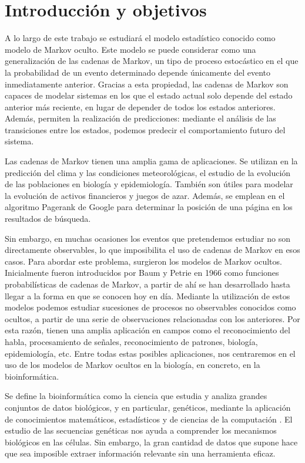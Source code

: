 \chapter*{Introducción y objetivos}


A lo largo de este trabajo se estudiará el modelo estadístico conocido como modelo de Markov oculto. Este modelo se puede considerar como una generalización de las cadenas de Markov, un tipo de proceso estocástico en el que la probabilidad de un evento determinado depende únicamente del evento inmediatamente anterior. Gracias a esta propiedad, las cadenas de Markov son capaces de modelar sistemas en los que el estado actual solo depende del estado anterior más reciente, en lugar de depender de todos los estados anteriores. Además, permiten la realización de predicciones: mediante el análisis de las transiciones entre los estados, podemos predecir el comportamiento futuro del sistema. 

Las cadenas de Markov tienen una amplia gama de aplicaciones. Se utilizan en la predicción del clima y las condiciones meteorológicas, el estudio de la evolución de las poblaciones en biología y epidemiología. También son útiles para modelar la evolución de activos financieros y juegos de azar. Además, se emplean en el algoritmo Pagerank de Google para determinar la posición de una página en los resultados de búsqueda.

Sin embargo, en muchas ocasiones los eventos que pretendemos estudiar no son directamente observables, lo que imposibilita el uso de cadenas de Markov en esos casos. Para abordar este problema, surgieron los modelos de Markov ocultos. Inicialmente fueron introducidos por Baum y Petrie en 1966 \cite{Baum} como funciones probabilísticas de cadenas de Markov, a partir de ahí se han desarrollado hasta llegar a la forma en que se conocen hoy en día. Mediante la utilización de estos modelos podemos estudiar sucesiones de procesos no observables conocidos como ocultos, a partir de una serie de observaciones relacionadas con los anteriores. Por esta razón, tienen una amplia aplicación en campos como el reconocimiento del habla, procesamiento de señales, reconocimiento de patrones, biología, epidemiología, etc. Entre todas estas posibles aplicaciones, nos centraremos en el uso de los modelos de Markov ocultos en la biología, en concreto, en la bioinformática. 

Se define la bioinformática como la ciencia que estudia y analiza grandes conjuntos de datos biológicos, y en particular, genéticos, mediante la aplicación de conocimientos matemáticos, estadísticos y de ciencias de la computación \cite{Warren}. El estudio de las secuencias genéticas nos ayuda a comprender los mecanismos biológicos en las células. Sin embargo, la gran cantidad de datos que supone hace que sea imposible extraer información relevante sin una herramienta eficaz. 

